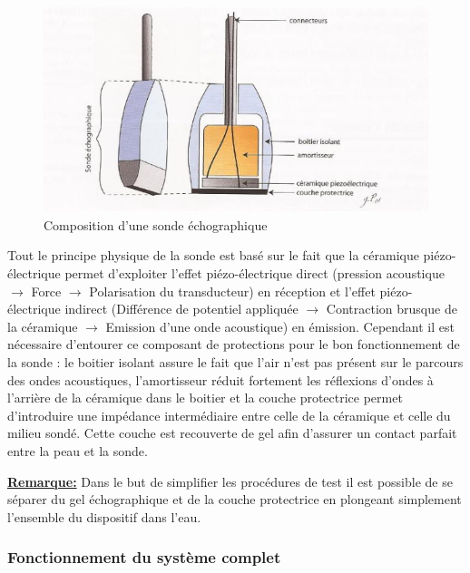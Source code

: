 \documentclass[12pt]{article}
\begin{document}
\begin{figure}[!h]
  \vspace{-0pt}
  \begin{center}
    \includegraphics[width=15cm]{Images_Rapport/transducteurs}
  \end{center}
  
  \caption{Composition d'une sonde échographique \cite{sonde}}
  
\end{figure}

Tout le principe physique de la sonde est basé sur le fait que la céramique piézo-électrique permet d'exploiter l'effet piézo-électrique direct (pression acoustique $\rightarrow$ Force $\rightarrow$ Polarisation du transducteur) en réception et l'effet piézo-électrique indirect (Différence de potentiel appliquée $\rightarrow$ Contraction brusque de la céramique $\rightarrow$ Emission d'une onde acoustique) en émission. Cependant il est nécessaire d'entourer ce composant de protections pour le bon fonctionnement de la sonde : le boitier isolant assure le fait que l'air n'est pas présent sur le parcours des ondes acoustiques, l'amortisseur réduit fortement les réflexions d'ondes à l'arrière de la céramique dans le boitier et la couche protectrice permet d'introduire une impédance intermédiaire entre celle de la céramique et celle du milieu sondé. Cette couche est recouverte de gel afin d'assurer un contact parfait entre la peau et la sonde. \par 
\vspace{10pt}

\underline{\textbf{Remarque:}} Dans le but de simplifier les procédures de test il est possible de se séparer du gel échographique et de la couche protectrice en plongeant simplement l'ensemble du dispositif dans l'eau.
\newpage
\subsubsection{Fonctionnement du système complet}
\end{document}
